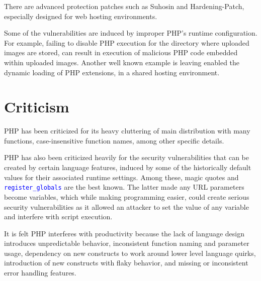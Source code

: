 There are advanced protection patches such as Suhosin and Hardening-Patch, especially designed for web hosting environments.

Some of the vulnerabilities are induced by improper PHP's runtime configuration. For example, failing to disable PHP execution for the directory where uploaded images are stored, can result in execution of malicious PHP code embedded within uploaded images. Another well known example is leaving enabled the dynamic loading of PHP extensions, in a shared hosting environment.










\chapter{Criticism}




PHP has been criticized for its heavy cluttering of main distribution with many functions, case-insensitive function names, among other specific details.


PHP has also been criticized heavily for the security vulnerabilities that can be created by certain language features, induced by some of the historically default values for their associated runtime settings. Among these, magic quotes and \textcolor{Blue}{\texttt{register\_globals}} are the best known. The latter made any URL parameters become variables, which while making programming easier, could create serious security vulnerabilities as it allowed an attacker to set the value of any variable and interfere with script execution.

It is felt PHP interferes with productivity because the lack of language design introduces unpredictable behavior, inconsistent function naming and parameter usage, dependency on new constructs to work around lower level language quirks, introduction of new constructs with flaky behavior, and missing or inconsistent error handling features.


